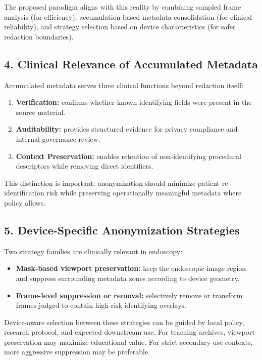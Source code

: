 The proposed paradigm aligns with this reality by combining sampled frame
analysis (for efficiency), accumulation-based metadata consolidation (for
clinical reliability), and strategy selection based on device characteristics
(for safer redaction boundaries).

\subsection*{4. Clinical Relevance of Accumulated Metadata}
Accumulated metadata serves three clinical functions beyond redaction itself:
\begin{enumerate}
  \item \textbf{Verification:} confirms whether known identifying fields were
  present in the source material.
  \item \textbf{Auditability:} provides structured evidence for privacy
  compliance and internal governance review.
  \item \textbf{Context Preservation:} enables retention of non-identifying
  procedural descriptors while removing direct identifiers.
\end{enumerate}

This distinction is important: anonymization should minimize patient
re-identification risk while preserving operationally meaningful metadata where
policy allows.

\subsection*{5. Device-Specific Anonymization Strategies}
Two strategy families are clinically relevant in endoscopy:
\begin{itemize}
  \item \textbf{Mask-based viewport preservation:} keep the endoscopic image
  region and suppress surrounding metadata zones according to device geometry.
  \item \textbf{Frame-level suppression or removal:} selectively remove or
  transform frames judged to contain high-risk identifying overlays.
\end{itemize}

Device-aware selection between these strategies can be guided by local policy,
research protocol, and expected downstream use. For teaching archives, viewport
preservation may maximize educational value. For strict secondary-use contexts,
more aggressive suppression may be preferable.

